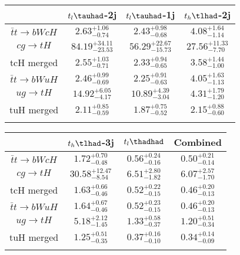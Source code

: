 \centering
\begin{tabular}{cccc} \toprule\toprule
 & $t_l\tauhad$-2j & $t_l\tauhad$-1j & $t_h\tlhad$-2j\\\midrule
$\bar{t}t\to bWcH$ & $2.63^{+1.06}_{-0.74}$ & $2.43^{+0.98}_{-0.68}$ & $4.08^{+1.64}_{-1.14}$\\
$cg\to tH$ & $84.19^{+34.11}_{-23.53}$ & $56.29^{+22.67}_{-15.73}$ & $27.56^{+11.33}_{-7.70}$\\
tcH merged & $2.55^{+1.03}_{-0.71}$ & $2.33^{+0.94}_{-0.65}$ & $3.58^{+1.44}_{-1.00}$\\
$\bar{t}t\to bWuH$ & $2.46^{+0.99}_{-0.69}$ & $2.25^{+0.91}_{-0.63}$ & $4.05^{+1.63}_{-1.13}$\\
$ug\to tH$ & $14.92^{+6.05}_{-4.17}$ & $10.89^{+4.39}_{-3.04}$ & $4.31^{+1.79}_{-1.20}$\\
tuH merged & $2.11^{+0.85}_{-0.59}$ & $1.87^{+0.75}_{-0.52}$ & $2.15^{+0.88}_{-0.60}$\\
\bottomrule\bottomrule\\
\end{tabular}
\begin{tabular}{cccc} \toprule\toprule
 & $t_h\tlhad$-3j & $t_l\thadhad$ & Combined\\\midrule
$\bar{t}t\to bWcH$ & $1.72^{+0.70}_{-0.48}$ & $0.56^{+0.24}_{-0.16}$ & $0.50^{+0.21}_{-0.14}$\\
$cg\to tH$ & $30.58^{+12.47}_{-8.54}$ & $6.51^{+2.80}_{-1.82}$ & $6.07^{+2.57}_{-1.70}$\\
tcH merged & $1.63^{+0.66}_{-0.46}$ & $0.52^{+0.22}_{-0.15}$ & $0.46^{+0.20}_{-0.13}$\\
$\bar{t}t\to bWuH$ & $1.64^{+0.67}_{-0.46}$ & $0.52^{+0.23}_{-0.15}$ & $0.46^{+0.20}_{-0.13}$\\
$ug\to tH$ & $5.18^{+2.12}_{-1.45}$ & $1.33^{+0.58}_{-0.37}$ & $1.20^{+0.51}_{-0.34}$\\
tuH merged & $1.25^{+0.51}_{-0.35}$ & $0.37^{+0.16}_{-0.10}$ & $0.34^{+0.14}_{-0.09}$\\
\bottomrule\bottomrule\\
\end{tabular}